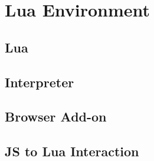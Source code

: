 \chapter{Lua Environment}

\section{Lua} 

\section{Interpreter}
\section{Browser Add-on}

\section{JS to Lua Interaction}

